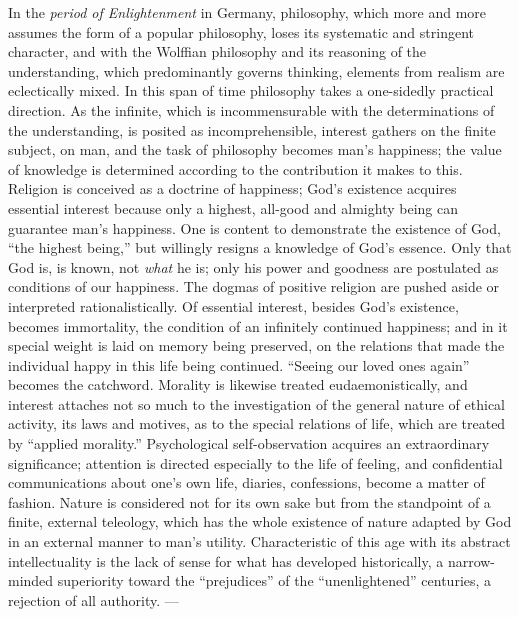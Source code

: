 \divrule

In the \emph{period of Enlightenment} in Germany, philosophy, which more and more assumes the form
of a popular philosophy, loses its systematic and stringent character, and with the Wolffian
philosophy and its reasoning of the understanding, which predominantly governs thinking, elements
from realism are eclectically mixed. In this span of time philosophy takes a one-sidedly practical
direction. As the infinite, which is incommensurable with the determinations of the understanding,
is posited as incomprehensible, interest gathers on the finite subject, on man, and the task of
philosophy becomes man's happiness; the value of knowledge is determined according to the
contribution it makes to this. Religion is conceived as a doctrine of happiness; God's existence
acquires essential interest because only a highest, all-good and almighty being can guarantee man's
happiness. One is content to demonstrate the existence of God, ``the highest being,''
but willingly resigns a knowledge of God's essence. Only that God is, is known, not \emph{what} he
is; only his power and goodness are postulated as conditions of our happiness. The dogmas of
positive religion are pushed aside or interpreted rationalistically. Of essential interest, besides
God's existence, becomes immortality, the condition of an infinitely continued happiness; and in it
special weight is laid on memory being preserved, on the relations that made the individual happy
in this life being continued. ``Seeing our loved ones again'' becomes the catchword. Morality is
likewise treated eudaemonistically, and interest attaches not so much to the investigation of the
general nature of ethical activity, its laws and motives, as to the special relations of life,
which are treated by ``applied morality.'' Psychological self-observation acquires an extraordinary
significance; attention is directed especially to the life of feeling, and confidential
communications about one's own life, diaries, confessions, become a matter of fashion. Nature is
considered not for its own sake but from the standpoint of a finite, external teleology, which has
the whole existence of nature adapted by God in an external manner to man's utility.
Characteristic of this age with its abstract intellectuality is the lack of sense for what has
developed historically, a narrow-minded superiority toward the ``prejudices'' of the
``unenlightened'' centuries, a rejection of all authority. ---

